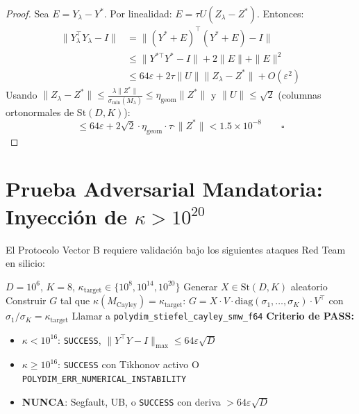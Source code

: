 \begin{proof}
Sea $E = Y_\lambda - Y^*$. Por linealidad: $E = \tau U (Z_\lambda - Z^*)$.
Entonces:
\begin{align}
  \|Y_\lambda^\top Y_\lambda - I\| &= \|(Y^* + E)^\top(Y^* + E) - I\| \\
  &\le \|Y^{*\top}Y^* - I\| + 2\|E\| + \|E\|^2 \\
  &\le 64\varepsilon + 2\tau\|U\|\|Z_\lambda - Z^*\| + O(\varepsilon^2)
\end{align}
Usando $\|Z_\lambda - Z^*\| \le \frac{\lambda \|Z^*\|}{\sigma_{\min}(M_\lambda)} \le \eta_{\text{geom}} \|Z^*\|$
y $\|U\| \le \sqrt{2}$ (columnas ortonormales de $\mathrm{St}(D,K)$):
\begin{equation}
  \le 64\varepsilon + 2\sqrt{2} \cdot \eta_{\text{geom}} \cdot \tau \cdot \|Z^*\| < 1.5 \times 10^{-8} \qquad \square
\end{equation}
\end{proof}

\section{Prueba Adversarial Mandatoria: Inyección de $\kappa > 10^{20}$}

El Protocolo Vector B requiere validación bajo los siguientes ataques Red Team en silicio:

\begin{algorithm}
\caption{Ataque Bulldózer V765: Matrices Mal Condicionadas en $\mathrm{St}(D,K)$}
\begin{algorithmic}[1]
\Require $D = 10^6$, $K = 8$, $\kappa_{\text{target}} \in \{10^8, 10^{14}, 10^{20}\}$
\State Generar $X \in \mathrm{St}(D,K)$ aleatorio
\State Construir $G$ tal que $\kappa(M_{\text{Cayley}}) = \kappa_{\text{target}}$:
  $G = X \cdot V \cdot \text{diag}(\sigma_1, \ldots, \sigma_K) \cdot V^\top$
  con $\sigma_1/\sigma_K = \kappa_{\text{target}}$
\State Llamar a \texttt{polydim\_stiefel\_cayley\_smw\_f64}
\State \textbf{Criterio de PASS:}
  \begin{itemize}
    \item $\kappa < 10^{16}$: \texttt{SUCCESS}, $\|Y^\top Y - I\|_{\max} \le 64\varepsilon\sqrt{D}$
    \item $\kappa \ge 10^{16}$: \texttt{SUCCESS} con Tikhonov activo O \texttt{POLYDIM\_ERR\_NUMERICAL\_INSTABILITY}
    \item \textbf{NUNCA}: Segfault, UB, o \texttt{SUCCESS} con deriva $> 64\varepsilon\sqrt{D}$
  \end{itemize}
\end{algorithmic}
\end{algorithm}

